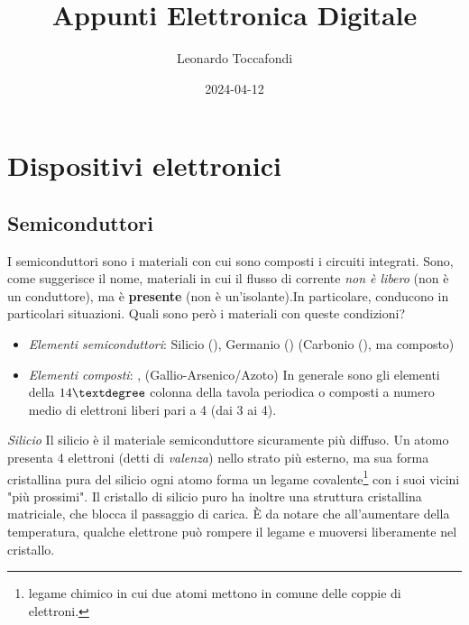\documentclass[
]{book}
\title{Appunti Elettronica Digitale}
\author{Leonardo Toccafondi}
\date{2024-04-12}
\providecommand{\tightlist}{%
  \setlength{\itemsep}{0pt}\setlength{\parskip}{0pt}}
\begin{document}
\frontmatter
\maketitle

{
\setcounter{tocdepth}{2}
\tableofcontents
}
\mainmatter
\chapter{Dispositivi elettronici}\label{dispositivi-elettronici}

\section{Semiconduttori}\label{semiconduttori}

I semiconduttori sono i materiali con cui sono composti i circuiti
integrati. Sono, come suggerisce il nome, materiali in cui il flusso di
corrente \emph{non è libero} (non è un conduttore), ma è
\textbf{presente} (non è un'isolante).\newline In particolare, conducono
in particolari situazioni. Quali sono però i materiali con queste
condizioni?

\begin{itemize}
\tightlist
\item
  \emph{Elementi semiconduttori}: Silicio (), Germanio ()
  (Carbonio (), ma composto)
\item
  \emph{Elementi composti}: ,  (Gallio-Arsenico/Azoto)
  In generale sono gli elementi della \(14\textdegree\) colonna della
  tavola periodica o composti a numero medio di elettroni liberi pari a
  4 (dai 3 ai 4).
\end{itemize}

\begin{redbox}{\emph{Silicio}}
Il silicio è il materiale semiconduttore sicuramente più diffuso. \newline
Un atomo presenta 4 elettroni (detti di \emph{valenza}) nello strato più esterno,
ma sua forma cristallina pura del silicio ogni atomo forma un legame covalente\footnote{legame chimico in cui due atomi mettono in comune delle coppie di elettroni.}
con i suoi vicini "più prossimi".
Il cristallo di silicio puro ha inoltre una struttura cristallina matriciale,
che blocca il passaggio di carica. \newline
È da notare che all'aumentare della temperatura, qualche elettrone può rompere il legame
e muoversi liberamente nel cristallo.
\end{redbox}
\end{document}
